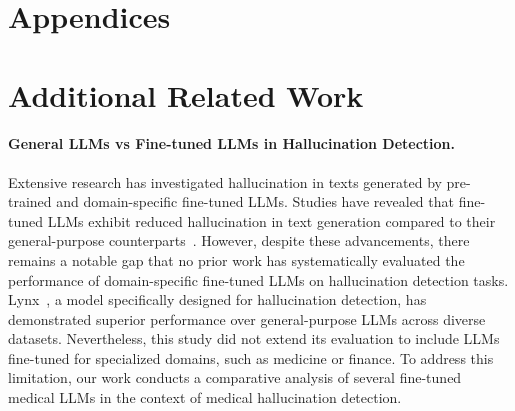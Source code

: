 \section*{Appendices}

\section{Additional Related Work}
\paragraph{General LLMs vs Fine-tuned LLMs in Hallucination Detection.}
Extensive research has investigated hallucination in texts generated by pre-trained and domain-specific fine-tuned LLMs. Studies have revealed that fine-tuned LLMs exhibit reduced hallucination in text generation compared to their general-purpose counterparts~\citep{azaria2023internalstatellmknows_detect2, xiong2024llmsexpressuncertaintyempirical, arteaga2024hallucinationdetectionllmsfast}. However, despite these advancements, there remains a notable gap that no prior work has systematically evaluated the performance of domain-specific fine-tuned LLMs on hallucination detection tasks. Lynx~\citep{ravi2024lynxopensourcehallucination}, a model specifically designed for hallucination detection, has demonstrated superior performance over general-purpose LLMs across diverse datasets. Nevertheless, this study did not extend its evaluation to include LLMs fine-tuned for specialized domains, such as medicine or finance. To address this limitation, our work conducts a comparative analysis of several fine-tuned medical LLMs in the context of medical hallucination detection.

